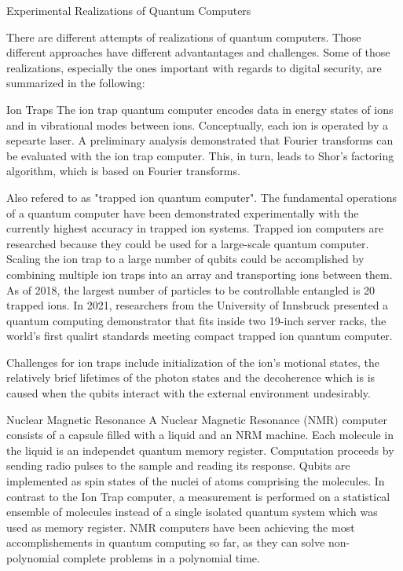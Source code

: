 \documentclass[aps,preprintnumbers,twocolumn]{revtex4}
\begin{document}
\begin{section}{Experimental Realizations of Quantum Computers}

There are different attempts of realizations of quantum computers.
Those different approaches have different advantantages and challenges. 
Some of those realizations, especially the ones important with regards to digital security, 
are summarized in the following:

\begin{subsection}{Ion Traps}
The ion trap quantum computer encodes data in energy states of ions and in vibrational modes between ions. 
Conceptually, each ion is operated by a sepearte laser. 
A preliminary analysis demonstrated that Fourier transforms can be evaluated with the ion trap computer. 
This, in turn, leads to Shor's factoring algorithm, 
which is based on Fourier transforms.

Also refered to as "trapped ion quantum computer". 
The fundamental operations of a quantum computer have been demonstrated experimentally with the currently highest accuracy in trapped ion systems. 
Trapped ion computers are researched because they could be used for a large-scale quantum computer.
Scaling the ion trap to a large number of qubits could be accomplished by combining multiple ion traps into an array and transporting ions between them. 
As of 2018, the largest number of particles to be controllable entangled is 20 trapped ions. 
In 2021, researchers from the University of Innsbruck presented a quantum computing demonstrator that fits inside two 19-inch server racks, 
the world's first qualirt standards meeting compact trapped ion quantum computer. 

Challenges for ion traps include initialization of the ion's motional states, 
the relatively brief lifetimes of the photon states and the decoherence which is is caused when the qubits interact with the external environment undesirably.
\end{subsection}

\begin{subsection}{Nuclear Magnetic Resonance}
A Nuclear Magnetic Resonance (NMR) computer consists of a capsule filled with a liquid and an NRM machine. 
Each molecule in the liquid is an independet quantum memory register. 
Computation proceeds by sending radio pulses to the sample and reading its response. 
Qubits are implemented as spin states of the nuclei of atoms comprising the molecules. 
In contrast to the Ion Trap computer, 
a measurement is performed on a statistical ensemble of molecules instead of a single isolated quantum system which was used as memory register. 
NMR computers have been achieving the most accomplishements in quantum computing so far, 
as they can solve non-polynomial complete problems in a polynomial time.


\end{subsection}
\end{section}
\end{document}
